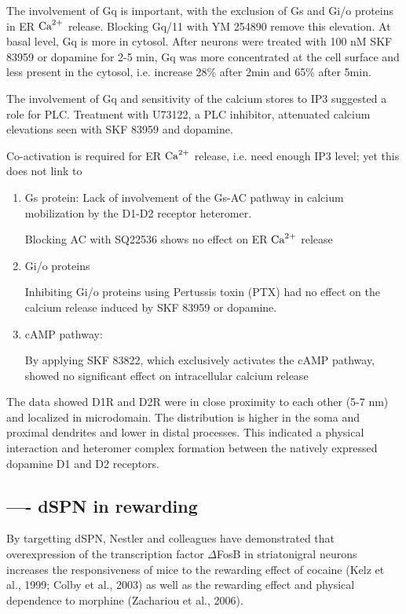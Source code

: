 The involvement of Gq is important, with the exclusion of Gs and Gi/o proteins
in ER ${\text{Ca}^{2+}}$ release. Blocking Gq/11 with YM 254890 remove this elevation.
At basal level, Gq is more in cytosol. After neurons were treated with 100 nM
SKF 83959 or dopamine for 2-5 min, Gq was more concentrated at the cell surface
and less present in the cytosol, i.e.
increase 28\% after 2min and 65\% after 5min.

The involvement of Gq and sensitivity of the calcium stores to IP3
suggested a role for PLC. Treatment with U73122, a PLC inhibitor,
attenuated calcium elevations seen with SKF 83959 and dopamine.

Co-activation is required for ER ${\text{Ca}^{2+}}$ release, i.e. need enough IP3 level; yet
this does not link to 
\begin{enumerate}
  
  \item  Gs protein: Lack of involvement of the Gs-AC pathway in calcium
  mobilization by the D1-D2 receptor heteromer.

Blocking  AC with SQ22536 shows no effect on ER ${\text{Ca}^{2+}}$ release

  \item Gi/o proteins
  
Inhibiting Gi/o proteins using Pertussis toxin (PTX)  had no effect on the
calcium release induced by SKF 83959 or dopamine.
  
  
  \item cAMP pathway:
  
By applying SKF 83822, which exclusively activates the cAMP pathway,
showed no significant effect on intracellular calcium release
  
\end{enumerate}

The data showed D1R and D2R were in close proximity to each other (5-7 nm) and
localized in microdomain. The distribution is higher in the soma and proximal
dendrites and lower in distal processes. This indicated a physical interaction
and heteromer complex formation between the natively expressed dopamine D1 and
D2 receptors.

\subsection{---- dSPN in rewarding}
\label{sec:dSPN-rewarding}

By targetting dSPN, Nestler and colleagues have demonstrated that overexpression
of the transcription factor $\Delta$FosB in striatonigral neurons increases the
responsiveness of mice to the rewarding effect of cocaine (Kelz et al., 1999;
Colby et al., 2003) as well as the rewarding effect and physical dependence to
morphine (Zachariou et al., 2006).






